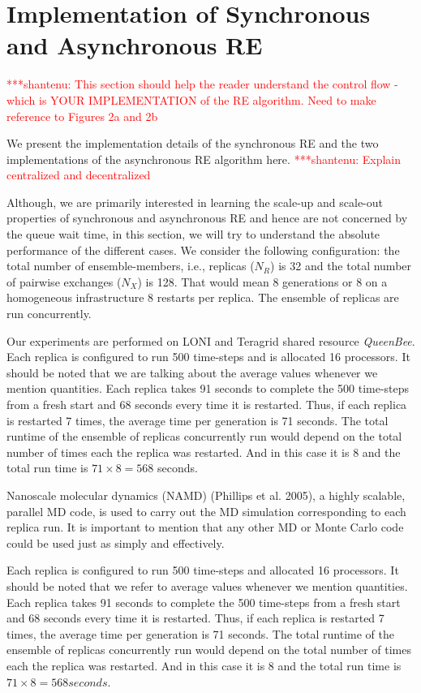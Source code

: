 \documentclass{rspublic}
\newcommand{\jhanote}[1]{ {\textcolor{red} { ***shantenu: #1 }}}
\newcommand{\jhanote}[1]{}
\begin{document}
\section{Implementation of Synchronous and Asynchronous RE}

\jhanote{This section should help the reader understand the control
  flow - which is YOUR IMPLEMENTATION of the RE algorithm. Need to
  make reference to Figures 2a and 2b}

We present the implementation details of the synchronous RE and the
two implementations of the asynchronous RE algorithm here.
\jhanote{Explain centralized and decentralized}

Although, we are primarily interested in learning the scale-up and
scale-out properties of synchronous and asynchronous RE and hence are
not concerned by the queue wait time, in this section, we will try to
understand the absolute performance of the different cases. We
consider the following configuration: the total number of
ensemble-members, i.e., replicas ($N_R$) is 32 and the total number of
pairwise exchanges ($N_X$) is 128. That would mean 8 generations or 8
on a homogeneous infrastructure 8 restarts per replica. The ensemble
of replicas are run concurrently.


Our experiments are performed on LONI and Teragrid
shared resource \emph{QueenBee}. Each replica is configured to run 500
time-steps and is allocated 16 processors. It should be noted that we are
talking about the average values whenever we mention quantities. Each
replica takes 91 seconds to complete the 500 time-steps from a fresh
start and 68 seconds every time it is restarted. Thus, if each replica
is restarted 7 times, the average time per generation is 71
seconds. The total runtime of the ensemble of replicas concurrently
run would depend on the total number of times each the replica was
restarted. And in this case it is 8 and the total run time is $71
\times 8 = 568$ seconds.


Nanoscale molecular dynamics (NAMD) (Phillips et al.
2005), a highly
scalable, parallel MD code, is used to carry out the MD
simulation
corresponding to each replica run. It is important to
mention that any other MD or
Monte Carlo code could be used just as
simply and effectively.


Each replica is configured to run 500 time-steps and allocated 16
processors. It should be noted that we refer to average
values whenever we mention quantities. Each replica takes 91 seconds
to complete the 500 time-steps from a fresh start and 68 seconds every
time it is restarted. Thus, if each replica is restarted 7 times, the
average time per generation is 71 seconds. The total runtime of the
ensemble of replicas concurrently run would depend on the total number
of times each the replica was restarted. And in this case it is 8 and
the total run time is $71 \times 8 = 568 seconds.$
\end{document}
